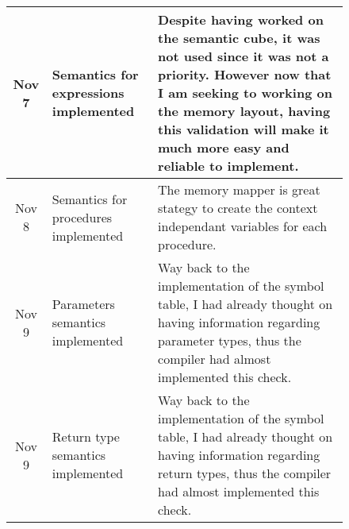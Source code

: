 \begin{figure}[H]
\begin{tabular}{cp{1.25in}p{2.5in}}
        \midrule
        Nov  7 & Semantics for \newline expressions \newline implemented &
        Despite having worked on the semantic cube, it was not used since it
        was not a priority. However now that I am seeking to working on the
        memory layout, having this validation will make it much more easy and
        reliable to implement.\\

        \midrule
        Nov  8 & Semantics for \newline procedures \newline implemented &
        The memory mapper is great stategy to create the context independant
        variables for each procedure.\\

        \midrule
        Nov  9 & Parameters \newline semantics \newline implemented &
        Way back to the implementation of the symbol table, I had already
        thought on having information regarding parameter types, thus the
        compiler had almost \newline implemented this check.\\
        
        \midrule
        Nov  9 & Return type \newline semantics \newline implemented &
        Way back to the implementation of the symbol table, I had already
        thought on having information regarding return types, thus the
        compiler had almost \newline implemented this check.\\

        \bottomrule
    \end{tabular}
\end{figure}

